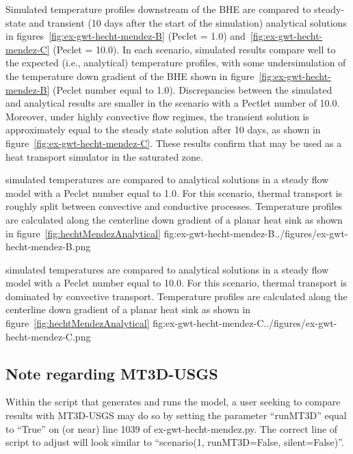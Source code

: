 Simulated temperature profiles downstream of the BHE are compared to steady-state and transient (10 days after the start of the simulation) analytical solutions in figures~\ref{fig:ex-gwt-hecht-mendez-B} (Peclet = 1.0) and~\ref{fig:ex-gwt-hecht-mendez-C} (Peclet = 10.0).  In each scenario, simulated results compare well to the expected (i.e., analytical) temperature profiles, with some undersimulation of the temperature down gradient of the BHE shown in figure~\ref{fig:ex-gwt-hecht-mendez-B} (Peclet number equal to 1.0).  Discrepancies between the simulated and analytical results are smaller in the scenario with a Pectlet number of 10.0.  Moreover, under highly convective flow regimes, the transient solution is approximately equal to the steady state solution after 10 days, as shown in figure~\ref{fig:ex-gwt-hecht-mendez-C}.  These results confirm that \mf may be used as a heat transport simulator in the saturated zone.

\begin{StandardFigure}{
                                     \mf simulated temperatures are compared to analytical solutions in a steady flow model with a Peclet number equal to 1.0. For this scenario, thermal transport is roughly split between convective and conductive processes.  Temperature profiles are calculated along the centerline down gradient of a planar heat sink as shown in figure~\ref{fig:hechtMendezAnalytical}
                                     }{fig:ex-gwt-hecht-mendez-B}{../figures/ex-gwt-hecht-mendez-B.png}
\end{StandardFigure}

\begin{StandardFigure}{
                                     \mf simulated temperatures are compared to analytical solutions in a steady flow model with a Peclet number equal to 10.0. For this scenario, thermal transport is dominated by convective transport.  Temperature profiles are calculated along the centerline down gradient of a planar heat sink as shown in figure~\ref{fig:hechtMendezAnalytical}
                                     }{fig:ex-gwt-hecht-mendez-C}{../figures/ex-gwt-hecht-mendez-C.png}
\end{StandardFigure}

\subsection{Note regarding MT3D-USGS}

Within the script that generates and runs the \mf model, a user seeking to compare \mf results with MT3D-USGS may do so by setting the parameter ``runMT3D'' equal to ``True'' on (or near) line 1039 of ex-gwt-hecht-mendez.py.  The correct line of script to adjust will look similar to ``scenario(1, runMT3D=False, silent=False)''.